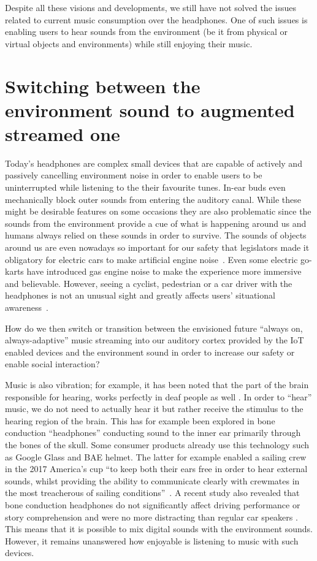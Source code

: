 \documentclass[sigchi]{acmart}
\begin{document}
Despite all these visions and developments, we still have not solved the issues related to current music consumption over the headphones. One of such issues is enabling users to hear sounds from the environment (be it from physical or virtual objects and environments) while still enjoying their music. 

\section{Switching between the environment sound to augmented streamed one}

Today's headphones are complex small devices that are capable of actively and passively cancelling environment noise in order to enable users to be uninterrupted while listening to the their favourite tunes. In-ear buds even mechanically block outer sounds from entering the auditory canal. While these might be desirable features on some occasions they are also problematic since the sounds from the environment provide a cue of what is happening around us and humans always relied on these sounds in order to survive. The sounds of objects around us are even nowadays so important for our safety that legislators made it obligatory for electric cars to make artificial engine noise~\cite{guy2019carnoise}. Even some electric go-karts have introduced gas engine noise to make the experience more immersive and believable. However, seeing a cyclist, pedestrian or a car driver with the headphones is not an unusual sight and greatly affects users' situational awareness~\cite{roads2018headphonedriving}. 


How do we then switch or transition between the envisioned future ``always on, always-adaptive'' music streaming into our auditory cortex provided by the IoT enabled devices and the environment sound in order to increase our safety or enable social interaction? 

Music is also vibration; for example, it has been noted that the part of the brain responsible for hearing, works perfectly in deaf people as well \cite{abcsciencemusic}. In order to ``hear'' music, we do not need to actually hear it but rather receive the stimulus to the hearing region of the brain. This has for example been explored in bone conduction ``headphones'' conducting sound to the inner ear primarily through the bones of the skull. Some consumer products already use this technology such as Google Glass and BAE helmet. The latter for example enabled a sailing crew in the 2017 America's cup ``to keep both their ears free in order to hear external sounds, whilst providing the ability to communicate clearly with crewmates in the most treacherous of sailing conditions''~\cite{bae2019boneconhelmet}. A recent study also revealed that bone conduction headphones do not significantly affect driving performance or story comprehension and were no more distracting than regular car speakers \cite{granados2018usability}. This means that it is possible to mix digital sounds with the environment sounds. However, it remains unanswered how enjoyable is listening to music with such devices. 
\end{document}
